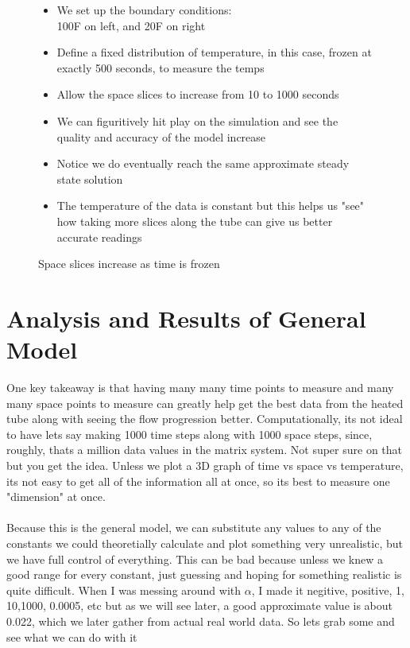 \documentclass[11pt]{article}
\begin{document}
\begin{onehalfspace}
\begin{figure}[h]
\begin{minipage}{0.48\textwidth}
        \caption{Space slices increase as time is frozen}
    \end{minipage}
    \hfill %
    \begin{minipage}[t]{0.48\textwidth}
        \vspace{-4cm} 
        \begin{itemize}
            \item We set up the boundary conditions: \\ 100F on left, and 20F on right
            \item Define a fixed distribution of temperature, in this case, frozen at
                  exactly 500 seconds, to measure the temps
            \item Allow the space slices to increase from 10 to 1000 seconds 
            \item We can figuritively hit play on the simulation and 
                  see the quality and accuracy of the model increase
            \item Notice we do eventually reach the same approximate steady state solution
            \item The temperature of the data is constant but this helps us "see" 
                  how taking more slices along the tube can give us better accurate readings
        \end{itemize}
    \end{minipage}
    \end{figure}
\vspace{15cm}
\section*{Analysis and Results of General Model}
One key takeaway is that having many many time points to measure and many many space points to measure
can greatly help get the best data from the heated tube along with seeing the flow progression better.
Computationally, its not ideal to have lets say making 1000 time steps along with 1000 space steps, since, roughly, thats 
a million data values in the matrix system. Not super sure on that but you get the idea. Unless we plot a 3D graph of time vs space vs temperature, its
not easy to get all of the information all at once, so its best to measure one "dimension" at once.
\\\\
Because this is the general model, we can substitute any values to any of the constants
we could theoretially calculate and plot something very unrealistic, but we have
full control of everything. This can be bad because unless we knew a good range for 
every constant, just guessing and hoping for something realistic is quite difficult.
When I was messing around with $\alpha$, I made it negitive, positive, 1, 10,1000, 0.0005, etc
but as we will see later, a good approximate value is about 0.022, which we later gather
from actual real world data. So lets grab some and see what we can do with it


\end{onehalfspace}
\end{document}
